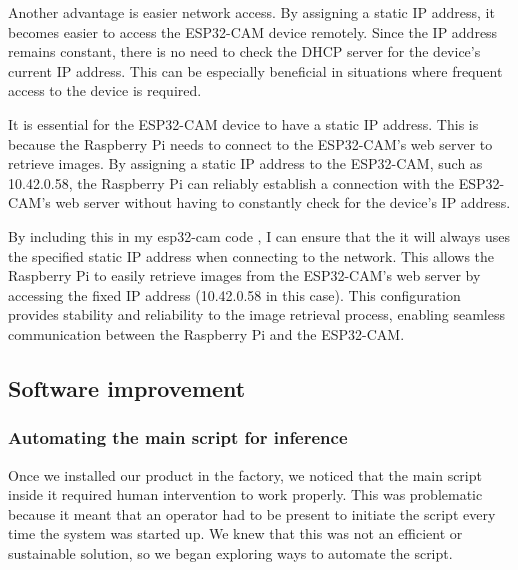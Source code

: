 Another advantage is easier network access. By assigning a static IP address, it becomes easier to access the ESP32-CAM device remotely. Since the IP address remains constant, there is no need to check the DHCP server for the device's current IP address. This can be especially beneficial in situations where frequent access to the device is required.\cite{HW22}

It is essential for the ESP32-CAM device to have a static IP address. This is because the Raspberry Pi needs to connect to the ESP32-CAM's web server to retrieve images. By assigning a static IP address to the ESP32-CAM, such as 10.42.0.58, the Raspberry Pi can reliably establish a connection with the ESP32-CAM's web server without having to constantly check for the device's IP address.\cite{HW22}




By including this in my esp32-cam code , I can ensure that the it will always uses the specified static IP address when connecting to the network. This allows the Raspberry Pi to easily retrieve images from the ESP32-CAM's web server by accessing the fixed IP address (10.42.0.58 in this case). This configuration provides stability and reliability to the image retrieval process, enabling seamless communication between the Raspberry Pi and the ESP32-CAM.
\subsection{Software improvement}
\subsubsection{Automating the main script for inference}
Once we installed our product in the factory, we noticed that the main script inside it required human intervention to work properly. This was problematic because it meant that an operator had to be present to initiate the script every time the system was started up. We knew that this was not an efficient or sustainable solution, so we began exploring ways to automate the script.


